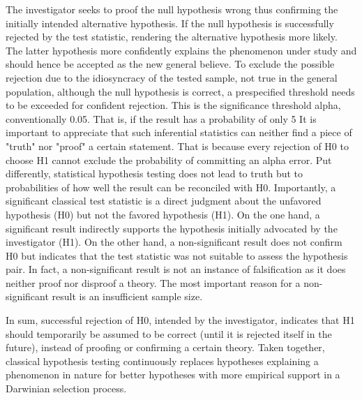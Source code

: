 \documentclass[authoryear,review,3p]{elsarticle}
\begin{document}
The investigator seeks to proof the null hypothesis wrong thus confirming the initially intended alternative hypothesis. If the null hypothesis is successfully rejected by the test statistic, rendering the alternative hypothesis more likely. The latter hypothesis more confidently explains the phenomenon under study and should hence be accepted as the new general believe.
To exclude the possible rejection due to the idiosyncracy of the tested sample, not true in the general population, although the null hypothesis is correct, a prespecified threshold needs to be exceeded for confident rejection. This is the significance threshold alpha, conventionally 0.05.
That is, if the result has a probability of only 5%
It is important to appreciate that such inferential statistics can neither find a piece of "truth" nor "proof" a certain statement. That is because every rejection of H0 to choose H1 cannot exclude the probability of committing an alpha error. Put differently, statistical hypothesis testing does not lead to truth but to probabilities of how well the result can be reconciled with H0. Importantly, a significant classical test statistic is a direct judgment about the unfavored hypothesis (H0) but not the favored hypothesis (H1). On the one hand, a significant result indirectly supports the hypothesis initially advocated by the investigator (H1). On the other hand, a non-significant result does not confirm H0 but indicates that the test statistic was not suitable to assess the hypothesis pair. In fact, a non-significant result is not an instance of falsification as it does neither proof nor disproof a theory. The most important reason for a non-significant result is an insufficient sample size.

In sum, successful rejection of H0, intended by the investigator, indicates that H1 should temporarily be assumed to be correct (until it is rejected itself in the future), instead of proofing or confirming a certain theory. Taken together, classical hypothesis testing continuously replaces hypotheses explaining a phenomenon in nature for better hypotheses with more empirical support in a Darwinian selection process.
\end{document}
